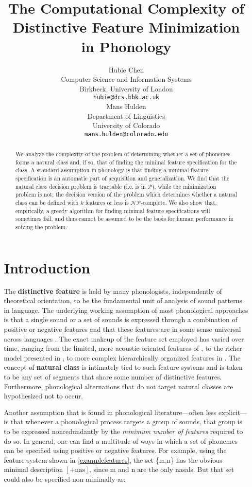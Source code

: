 \documentclass[11pt,a4paper]{article}
\title{The Computational Complexity of Distinctive Feature Minimization in Phonology}
\author{Hubie Chen \\
  Computer Science and Information Systems \\
  Birkbeck, University of London \\
  {\tt hubie@dcs.bbk.ac.uk} \\\And
Mans Hulden \\
  Department of Linguistics \\
  University of Colorado \\
  {\tt mans.hulden@colorado.edu} \\}
\date{}
\begin{document}
\maketitle
\begin{abstract}
We analyze the complexity of the problem of determining whether a set of phonemes forms a natural class and, if so, that of finding the minimal feature specification for the class. A standard assumption in phonology is that finding a minimal feature specification is an automatic part of acquisition and generalization.  We find that the natural class decision problem is tractable (i.e. is in $\mathcal{P}$), while the  minimization problem is not; the decision version of the problem which determines whether a natural class can be defined with $k$ features or less is $\mathcal{NP}$-complete. We also show that, empirically, a greedy algorithm for finding minimal feature specifications will sometimes fail, and thus cannot be assumed to be the basis for human performance in solving the problem.
\end{abstract}

\section{Introduction}

The \textbf{distinctive feature} is held by many phonologists, independently of theoretical orientation, to be the fundamental unit of analysis of sound patterns in language.  The underlying working assumption of most phonological approaches is that a single sound or a set of sounds is expressed through a combination of positive or negative features and that these features are in some sense universal across languages \citep{mielke2008}. The exact makeup of the feature set employed has varied over time, ranging from the limited, more acoustic-oriented features of , to the richer model presented in , to more complex hierarchically organized features in .  The concept of \textbf{natural class} is intimately tied to such feature systems and is taken to be any set of segments that share some number of distinctive features.  Furthermore, phonological alternations that do not target natural classes are hypothesized not to occur.

Another assumption that is found in phonological literature---often less explicit---is that whenever a phonological process targets a group of sounds, that group is to be expressed nonredundantly by the {\it minimum number of features} required to do so.  In general, one can find a multitude of ways in which a set of phonemes can be specified using positive or negative features.  For example, using the feature system shown in \cref{examplefeatures}, the set \{m,n\} has the obvious minimal description $[\textrm{+nas}]$, since m and n are the only nasals.  But that set could also be specified non-minimally as:
\end{document}
